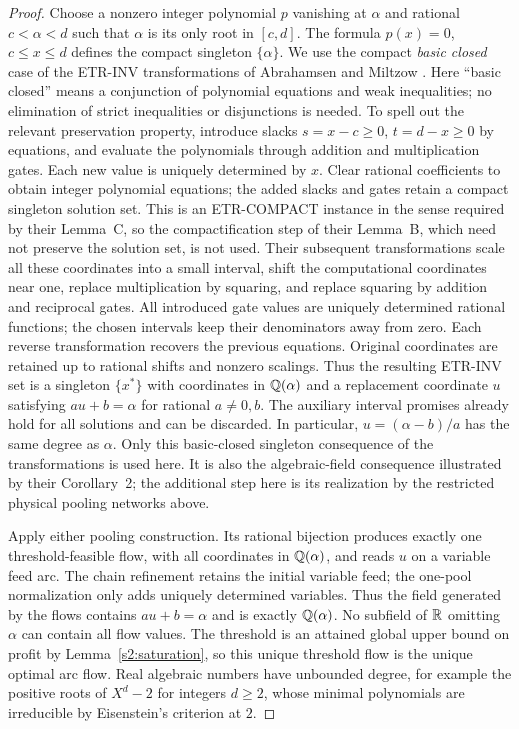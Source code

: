 \begin{proof}
Choose a nonzero integer polynomial $p$ vanishing at $\alpha$ and
rational $c<\alpha<d$ such that $\alpha$ is its only root in $[c,d]$.
The formula $p(x)=0$, $c\le x\le d$ defines the compact singleton
$\{\alpha\}$. We use the compact \emph{basic closed} case of the
ETR-INV transformations of Abrahamsen and Miltzow
\citep[Lemmas~C--G, underlying Theorem~1]{abrahamsen2019-dynamic-toolbox-for-etrinv}.
Here ``basic closed'' means a conjunction of polynomial equations and
weak inequalities; no elimination of strict inequalities or disjunctions
is needed. To spell out the relevant preservation property, introduce
slacks $s=x-c\ge0$, $t=d-x\ge0$ by equations, and evaluate the
polynomials through addition and multiplication gates. Each new value
is uniquely determined by $x$. Clear rational coefficients to obtain
integer polynomial equations; the added slacks and gates retain a
compact singleton solution set. This is an ETR-COMPACT instance in the
sense required by their Lemma~C, so the compactification step of their
Lemma~B, which need not preserve the solution set, is not used.
Their subsequent transformations scale all these coordinates into a
small interval, shift the computational coordinates near one, replace
multiplication by squaring, and replace squaring by addition and
reciprocal gates. All introduced gate values are uniquely determined
rational functions; the chosen intervals keep their denominators away
from zero. Each reverse transformation recovers the previous equations.
Original coordinates are retained up to rational shifts and nonzero
scalings. Thus the resulting \textsc{ETR-INV} set is a singleton
$\{x^*\}$ with coordinates in $\mathbb Q(\alpha)$ and a replacement
coordinate $u$ satisfying $au+b=\alpha$ for rational $a\ne0,b$.
The auxiliary interval promises already hold for all solutions and can
be discarded. In particular, $u=(\alpha-b)/a$ has the same degree as
$\alpha$. Only this basic-closed singleton consequence of the
transformations is used here. It is also the algebraic-field consequence
illustrated by their Corollary~2; the additional step here is its
realization by the restricted physical pooling networks above.

Apply either pooling construction. Its rational bijection produces
exactly one threshold-feasible flow, with all coordinates in
$\mathbb Q(\alpha)$, and reads $u$ on a variable feed arc. The chain
refinement retains the initial variable feed; the one-pool
normalization only adds uniquely determined variables. Thus the field
generated by the flows contains $au+b=\alpha$ and is exactly
$\mathbb Q(\alpha)$. No subfield of $\mathbb R$ omitting $\alpha$ can contain all
flow values. The threshold is an attained global upper bound on profit
by Lemma~\ref{s2:saturation}, so this unique threshold flow is the
unique optimal arc flow. Real algebraic numbers have unbounded degree,
for example the positive roots of $X^d-2$ for integers $d\ge2$, whose
minimal polynomials are irreducible by Eisenstein's criterion at $2$.
\end{proof}

